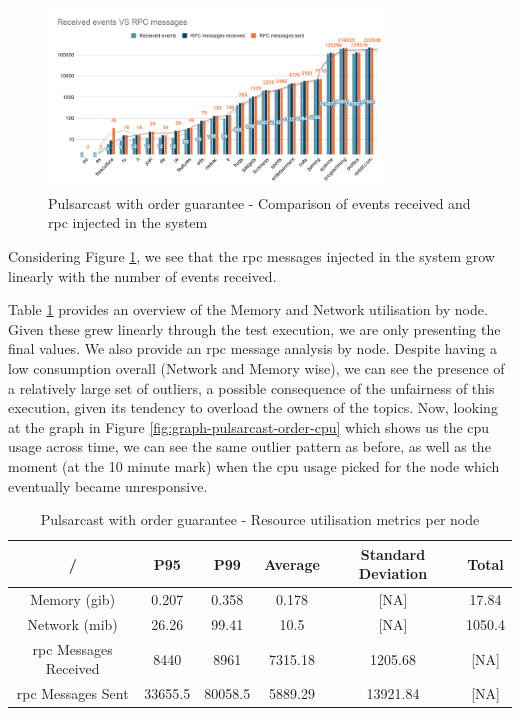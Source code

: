 \begin{figure}[!htb]
  \centering
  \includegraphics[width=0.8\textwidth]{../images/graph-pulsarcast-order-rpc.png}
  \caption{Pulsarcast with order guarantee - Comparison of events received and \acrshort{rpc} injected in the system}
  \label{fig:graph-pulsarcast-order-rpc}
\end{figure}

Considering Figure \ref{fig:graph-pulsarcast-order-rpc}, we see that the
\acrshort{rpc} messages injected in the system grow linearly with the number of
events received.

Table \ref{table:pulsarcast-order} provides an overview of the Memory and
Network utilisation by node. Given these grew linearly through the test
execution, we are only presenting the final values. We also provide an \acrshort{rpc}
message analysis by node. Despite having a low consumption overall (Network and
Memory wise), we can see the presence of a relatively large set of outliers, a
possible consequence of the unfairness of this execution, given its tendency to
overload the owners of the topics. Now, looking at the graph in Figure
\ref{fig:graph-pulsarcast-order-cpu} which shows us the \acrshort{cpu} usage across time,
we can see the same outlier pattern as before, as well as the moment (at the 10
minute mark) when the \acrshort{cpu} usage picked for the node which eventually became
unresponsive.

\begin{table}[!htb]
\caption{Pulsarcast with order guarantee - Resource utilisation metrics per node}
\label{table:pulsarcast-order}
  \begin{center}
   \begin{tabular}{|c| c c c c c|} 
   \hline
   / & P95 & P99 & Average & Standard Deviation & Total \\ [0.5ex] 
   \hline\hline
   Memory (\acrshort{gib}) & 0.207 & 0.358 & 0.178 & [NA] & 17.84 \\
   \hline
   Network (\acrshort{mib}) & 26.26 & 99.41 & 10.5 & [NA] & 1050.4 \\
   \hline
   \acrshort{rpc} Messages Received & 8440 & 8961 & 7315.18 & 1205.68 & [NA] \\
   \hline
   \acrshort{rpc} Messages Sent & 33655.5 & 80058.5 & 5889.29 & 13921.84 & [NA] \\ [1ex] 
   \hline
  \end{tabular}
  \end{center}
\end{table}

